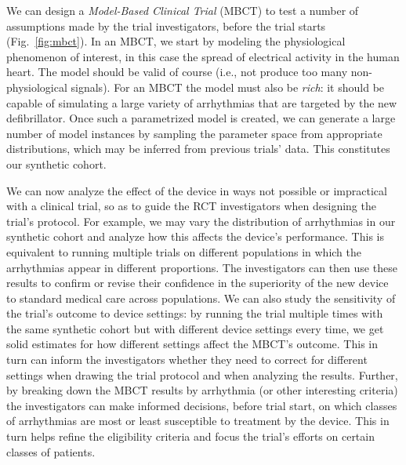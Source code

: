

We can design a \emph{Model-Based Clinical Trial} (MBCT) to test a number of assumptions made by the trial investigators, before the trial starts (Fig.~\ref{fig:mbct}).
In an MBCT, we start by modeling the physiological phenomenon of interest, in this case the spread of electrical activity in the human heart.
The model should be valid of course (i.e., not produce too many non-physiological signals).
For an MBCT the model must also be \emph{rich}: it should be capable of simulating a large variety of arrhythmias that are targeted by the new defibrillator.
Once such a parametrized model is created, we can generate a large number of model instances by sampling the parameter space from appropriate distributions, which may be inferred from previous trials' data.
This constitutes our synthetic cohort. 



We can now analyze the effect of the device in ways not possible or impractical with a clinical trial, so as to guide the RCT investigators when designing the trial's protocol.
For example, we may vary the distribution of arrhythmias in our synthetic cohort and analyze how this affects the device's performance. 
This is equivalent to running multiple trials on different populations in which the arrhythmias appear in different proportions.
The investigators can then use these results to confirm or revise their confidence in the superiority of the new device to standard medical care across populations.
We can also study the sensitivity of the trial's outcome to device settings: by running the trial multiple times with the same synthetic cohort but with different device settings every time, we get solid estimates for how different settings affect the MBCT's outcome. 
This in turn can inform the investigators whether they need to correct for different settings when drawing the trial protocol and when analyzing the results.
Further, by breaking down the MBCT results by arrhythmia (or other interesting criteria) the investigators can make informed decisions, before trial start, on which classes of arrhythmias are most or least susceptible to treatment by the device.
This in turn helps refine the eligibility criteria and focus the trial's efforts on certain classes of patients. 

